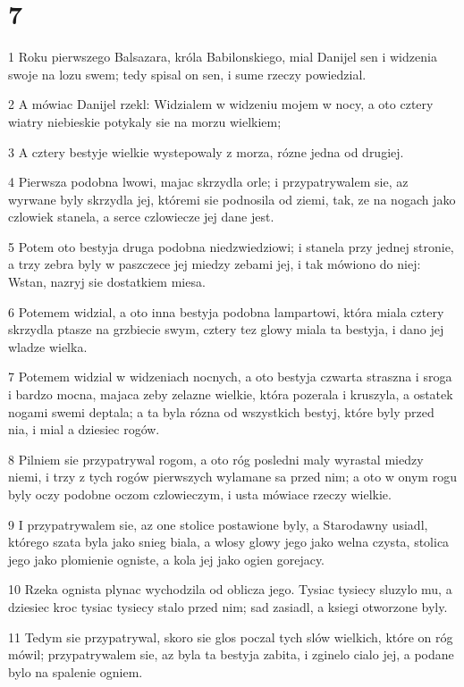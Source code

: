 \chapter{7}

\par 1 Roku pierwszego Balsazara, króla Babilonskiego, mial Danijel sen i widzenia swoje na lozu swem; tedy spisal on sen, i sume rzeczy powiedzial.
\par 2 A mówiac Danijel rzekl: Widzialem w widzeniu mojem w nocy, a oto cztery wiatry niebieskie potykaly sie na morzu wielkiem;
\par 3 A cztery bestyje wielkie wystepowaly z morza, rózne jedna od drugiej.
\par 4 Pierwsza podobna lwowi, majac skrzydla orle; i przypatrywalem sie, az wyrwane byly skrzydla jej, któremi sie podnosila od ziemi, tak, ze na nogach jako czlowiek stanela, a serce czlowiecze jej dane jest.
\par 5 Potem oto bestyja druga podobna niedzwiedziowi; i stanela przy jednej stronie, a trzy zebra byly w paszczece jej miedzy zebami jej, i tak mówiono do niej: Wstan, nazryj sie dostatkiem miesa.
\par 6 Potemem widzial, a oto inna bestyja podobna lampartowi, która miala cztery skrzydla ptasze na grzbiecie swym, cztery tez glowy miala ta bestyja, i dano jej wladze wielka.
\par 7 Potemem widzial w widzeniach nocnych, a oto bestyja czwarta straszna i sroga i bardzo mocna, majaca zeby zelazne wielkie, która pozerala i kruszyla, a ostatek nogami swemi deptala; a ta byla rózna od wszystkich bestyj, które byly przed nia, i mial a dziesiec rogów.
\par 8 Pilniem sie przypatrywal rogom, a oto róg posledni maly wyrastal miedzy niemi, i trzy z tych rogów pierwszych wylamane sa przed nim; a oto w onym rogu byly oczy podobne oczom czlowieczym, i usta mówiace rzeczy wielkie.
\par 9 I przypatrywalem sie, az one stolice postawione byly, a Starodawny usiadl, którego szata byla jako snieg biala, a wlosy glowy jego jako welna czysta, stolica jego jako plomienie ogniste, a kola jej jako ogien gorejacy.
\par 10 Rzeka ognista plynac wychodzila od oblicza jego. Tysiac tysiecy sluzylo mu, a dziesiec kroc tysiac tysiecy stalo przed nim; sad zasiadl, a ksiegi otworzone byly.
\par 11 Tedym sie przypatrywal, skoro sie glos poczal tych slów wielkich, które on róg mówil; przypatrywalem sie, az byla ta bestyja zabita, i zginelo cialo jej, a podane bylo na spalenie ogniem.
